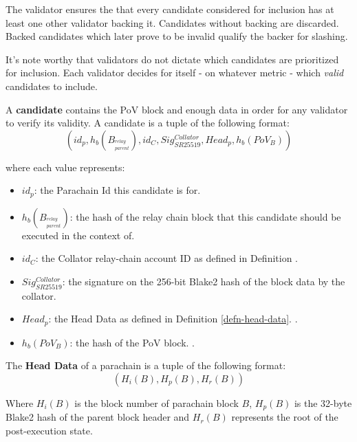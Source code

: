 The validator ensures the that every candidate considered for inclusion has at least
one other validator backing it. Candidates without backing are discarded. Backed candidates 
which later prove to be invalid qualify the backer for slashing.
\newline

It's note worthy that validators do not dictate which candidates are prioritized
for inclusion. Each validator decides for itself - on whatever metric - which
\textit{valid} candidates to include.

\begin{definition}
  \label{defn-candidate}
  A \textbf{candidate} contains the PoV block and enough data in order for any
  validator to verify its validity. A candidate is a tuple of the following
  format:
  \[
  (id_p, h_b({B_{^{relay}_{parent}}}), id_{C}, Sig^{Collator}_{SR25519}, Head_p, h_b({PoV_B}))
  \]

  where each value represents:
  \begin{itemize}
    \item $id_p$: the Parachain Id this candidate is for.
    \item $h_b({B_{^{relay}_{parent}}})$: the hash of the relay chain block that this
    candidate should be executed in the context of.
    \item $id_C$: the Collator relay-chain account ID as defined in Definition
    .
    \item $Sig^{Collator}_{SR25519}$: the signature on the 256-bit Blake2 hash
    of the block data by the collator.
    \item $Head_p$: the Head Data as defined in Definition \ref{defn-head-data}.
    .
    \item $h_b({PoV_B})$: the hash of the PoV block.
    .
  \end{itemize}

\end{definition}

\begin{definition}
  \label{defn-head-data}
  The \textbf{Head Data} of a parachain is a tuple of the following format:
  \[
    (H_i(B), H_p(B), H_r(B))
  \]

  Where $H_i(B)$ is the block number of parachain block $B$, $H_p(B)$ is the
  32-byte Blake2 hash of the parent block header and $H_r(B)$ represents the
  root of the post-execution state.
\end{definition}

